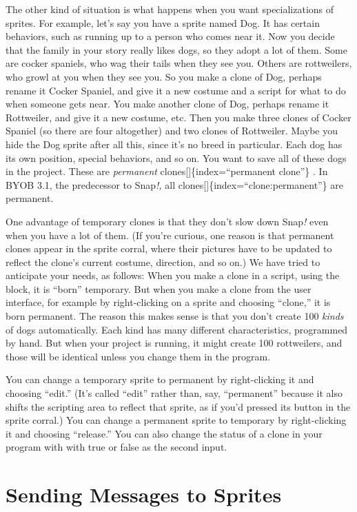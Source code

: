\documentclass[
  letterpaper,
]{book}
\begin{document}
The other kind of situation is what happens when you want
specializations of sprites. For example, let's say you have a sprite
named Dog. It has certain behaviors, such as running up to a person who
comes near it. Now you decide that the family in your story really likes
dogs, so they adopt a lot of them. Some are cocker spaniels, who wag
their tails when they see you. Others are rottweilers, who growl at you
when they see you. So you make a clone of Dog, perhaps rename it Cocker
Spaniel, and give it a new costume and a script for what to do when
someone gets near. You make another clone of Dog, perhaps rename it
Rottweiler, and give it a new costume, etc. Then you make three clones
of Cocker Spaniel (so there are four altogether) and two clones of
Rottweiler. Maybe you hide the Dog sprite after all this, since it's no
breed in particular. Each dog has its own position, special behaviors,
and so on. You want to save all of these dogs in the project. These are
\emph{permanent} clones{[}{]}\{index=``permanent clone''\} . In BYOB
3.1, the predecessor to Snap\emph{!,} all
clones{[}{]}\{index=``clone:permanent''\} are permanent.

One advantage of temporary clones is that they don't slow down
Snap\emph{!} even when you have a lot of them. (If you're curious, one
reason is that permanent clones appear in the sprite corral, where their
pictures have to be updated to reflect the clone's current costume,
direction, and so on.) We have tried to anticipate your needs, as
follows: When you make a clone in a script, using the block, it is
``born'' temporary. But when you make a clone from the user interface,
for example by right-clicking on a sprite and choosing ``clone,'' it is
born permanent. The reason this makes sense is that you don't create 100
\emph{kinds} of dogs automatically. Each kind has many different
characteristics, programmed by hand. But when your project is running,
it might create 100 rottweilers, and those will be identical unless you
change them in the program.

You can change a temporary sprite to permanent by right-clicking it and
choosing ``edit.'' (It's called ``edit'' rather than, say, ``permanent''
because it also shifts the scripting area to reflect that sprite, as if
you'd pressed its button in the sprite corral.) You can change a
permanent sprite to temporary by right-clicking it and choosing
``release.'' You can also change the status of a clone in your program
with with true or false as the second input.

\section{Sending Messages to Sprites}\label{sending-messages-to-sprites}
\end{document}
